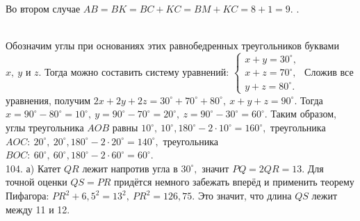 \documentclass[12pt]{article}
\begin{document}
Во втором случае $AB=BK=BC+KC=BM+KC=8+1=9.$\newpage
{}.\begin{figure}[ht!]
\end{figure}\\
Обозначим углы при основаниях этих равнобедренных треугольников буквами $x,\ y$ и $z.$ Тогда можно составить систему уравнений: $\begin{cases}x+y=30^\circ,\\
x+z=70^\circ,\\ y+z=80^\circ.\end{cases}$ Сложив все уравнения, получим $2x+2y+2z=30^\circ+70^\circ+80^\circ,\ x+y+z=90^\circ.$ Тогда $x=90^\circ-80^\circ=10^\circ,\ y=90^\circ-70^\circ=20^\circ,\ z=90^\circ-30^\circ=60^\circ.$ Таким образом, углы треугольника $AOB$ равны $10^\circ,\ 10^\circ, 180^\circ-2\cdot10^\circ=160^\circ,$ треугольника $AOC:\ 20^\circ,\ 20^\circ, 180^\circ-2\cdot20^\circ=140^\circ,$ треугольника $BOC:\ 60^\circ,\ 60^\circ, 180^\circ-2\cdot60^\circ=60^\circ.$\\
104. а) Катет $QR$ лежит напротив угла в $30^\circ,$ значит $PQ=2QR=13.$ Для точной оценки $QS=PR$ придётся немного забежать вперёд и применить теорему Пифагора: $PR^2+6,5^2=13^2,\ PR^2=126,75.$ Это значит, что длина $QS$ лежит между 11 и 12.\\
\end{document}
